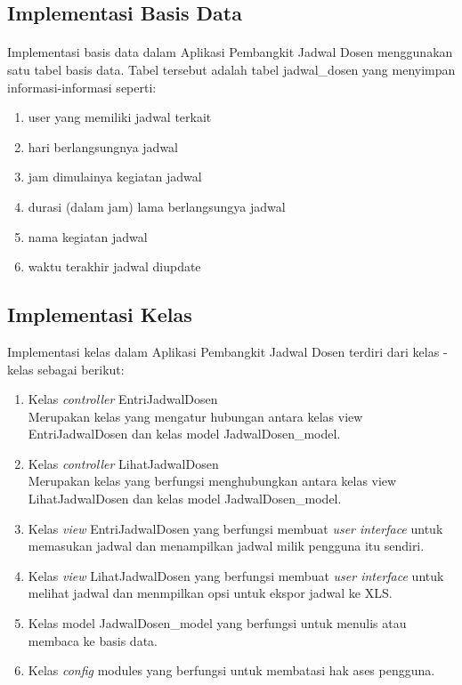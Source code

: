 \subsection{Implementasi Basis Data}
\paragraph{}Implementasi basis data dalam Aplikasi Pembangkit Jadwal Dosen menggunakan satu tabel basis data. Tabel tersebut adalah tabel jadwal\_dosen yang menyimpan informasi-informasi seperti:
\begin{enumerate}
	\item user yang memiliki jadwal terkait
	\item hari berlangsungnya jadwal
	\item jam dimulainya kegiatan jadwal 
	\item durasi (dalam jam) lama berlangsungya jadwal
	\item nama kegiatan jadwal
	\item waktu terakhir jadwal diupdate
\end{enumerate}

\subsection{Implementasi Kelas}
Implementasi kelas dalam Aplikasi Pembangkit Jadwal Dosen terdiri dari kelas - kelas sebagai berikut:
\begin{enumerate}
	\item Kelas \textit{controller} EntriJadwalDosen\\
	Merupakan kelas yang mengatur hubungan antara kelas view EntriJadwalDosen dan kelas model JadwalDosen\_model.
	\item Kelas \textit{controller} LihatJadwalDosen\\
	Merupakan kelas yang berfungsi menghubungkan antara kelas view LihatJadwalDosen dan kelas model JadwalDosen\_model.
	\item Kelas \textit{view} EntriJadwalDosen yang berfungsi membuat \textit{user interface} untuk memasukan jadwal dan menampilkan jadwal milik pengguna itu sendiri.
	\item Kelas \textit{view} LihatJadwalDosen yang berfungsi membuat \textit{user interface} untuk melihat jadwal dan menmpilkan opsi untuk ekspor jadwal ke XLS.
	\item Kelas model JadwalDosen\_model yang berfungsi untuk menulis atau membaca ke basis data.
	\item Kelas \textit{config} modules yang berfungsi untuk membatasi hak ases pengguna.
\end{enumerate}

